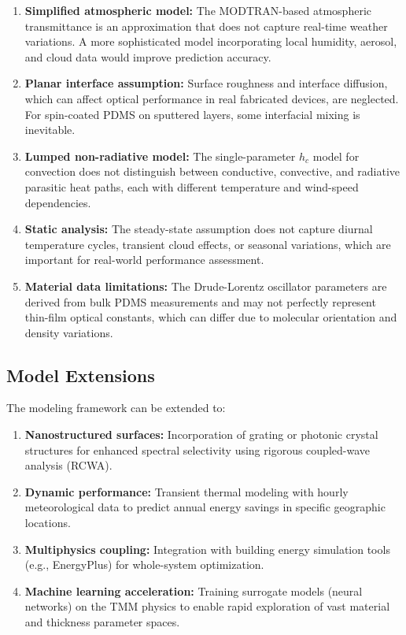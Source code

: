 \begin{enumerate}
  \item \textbf{Simplified atmospheric model:} The MODTRAN-based atmospheric transmittance is an approximation that does not capture real-time weather variations. A more sophisticated model incorporating local humidity, aerosol, and cloud data would improve prediction accuracy.

  \item \textbf{Planar interface assumption:} Surface roughness and interface diffusion, which can affect optical performance in real fabricated devices, are neglected. For spin-coated PDMS on sputtered layers, some interfacial mixing is inevitable.

  \item \textbf{Lumped non-radiative model:} The single-parameter $h_c$ model for convection does not distinguish between conductive, convective, and radiative parasitic heat paths, each with different temperature and wind-speed dependencies.

  \item \textbf{Static analysis:} The steady-state assumption does not capture diurnal temperature cycles, transient cloud effects, or seasonal variations, which are important for real-world performance assessment.

  \item \textbf{Material data limitations:} The Drude-Lorentz oscillator parameters are derived from bulk PDMS measurements and may not perfectly represent thin-film optical constants, which can differ due to molecular orientation and density variations.
\end{enumerate}

\subsection{Model Extensions}

The modeling framework can be extended to:

\begin{enumerate}
  \item \textbf{Nanostructured surfaces:} Incorporation of grating or photonic crystal structures for enhanced spectral selectivity using rigorous coupled-wave analysis (RCWA).

  \item \textbf{Dynamic performance:} Transient thermal modeling with hourly meteorological data to predict annual energy savings in specific geographic locations.

  \item \textbf{Multiphysics coupling:} Integration with building energy simulation tools (e.g., EnergyPlus) for whole-system optimization.

  \item \textbf{Machine learning acceleration:} Training surrogate models (neural networks) on the TMM physics to enable rapid exploration of vast material and thickness parameter spaces.
\end{enumerate}
